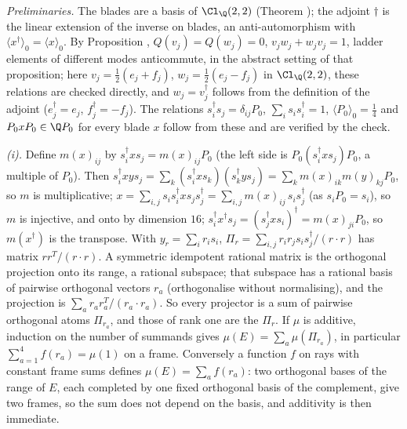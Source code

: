 \emph{Preliminaries.} The blades are a basis of $\Cl_{\Q}(2,2)$ (Theorem ); the adjoint $\dagger$ is the linear extension of the inverse on blades, an anti-automorphism with $\langle x^{\dagger}\rangle_{0} = \langle x\rangle_{0}$. By Proposition , $Q(v_{j}) = Q(w_{j}) = 0$, $v_{j}w_{j} + w_{j}v_{j} = 1$, ladder elements of different modes anticommute, in the abstract setting of that proposition; here $v_{j} = \tfrac12(e_{j} + f_{j})$, $w_{j} = \tfrac12(e_{j} - f_{j})$ in $\Cl_{\Q}(2,2)$, these relations are checked directly, and $w_{j} = v_{j}^{\dagger}$ follows from the definition of the adjoint ($e_{j}^{\dagger} = e_{j}$, $f_{j}^{\dagger} = -f_{j}$). The relations $s_{i}^{\dagger}s_{j} = \delta_{ij}P_{0}$, $\sum_{i}s_{i}s_{i}^{\dagger} = 1$, $\langle P_{0}\rangle_{0} = \tfrac14$ and $P_{0}xP_{0} \in \Q P_{0}$ for every blade $x$ follow from these and are verified by the check.

\emph{(i).} Define $m(x)_{ij}$ by $s_{i}^{\dagger}xs_{j} = m(x)_{ij}P_{0}$ (the left side is $P_{0}(s_{i}^{\dagger}xs_{j})P_{0}$, a multiple of $P_{0}$). Then $s_{i}^{\dagger}xys_{j} = \sum_{k}(s_{i}^{\dagger}xs_{k})(s_{k}^{\dagger}ys_{j}) = \sum_{k}m(x)_{ik}m(y)_{kj}P_{0}$, so $m$ is multiplicative; $x = \sum_{i,j}s_{i}s_{i}^{\dagger}xs_{j}s_{j}^{\dagger} = \sum_{i,j}m(x)_{ij}\,s_{i}s_{j}^{\dagger}$ (as $s_{i}P_{0} = s_{i}$), so $m$ is injective, and onto by dimension $16$; $s_{i}^{\dagger}x^{\dagger}s_{j} = (s_{j}^{\dagger}xs_{i})^{\dagger} = m(x)_{ji}P_{0}$, so $m(x^{\dagger})$ is the transpose. With $y_{r} = \sum_{i}r_{i}s_{i}$, $\Pi_{r} = \sum_{i,j}r_{i}r_{j}s_{i}s_{j}^{\dagger}/(r \cdot r)$ has matrix $rr^{T}/(r \cdot r)$. A symmetric idempotent rational matrix is the orthogonal projection onto its range, a rational subspace; that subspace has a rational basis of pairwise orthogonal vectors $r_{a}$ (orthogonalise without normalising), and the projection is $\sum_{a}r_{a}r_{a}^{T}/(r_{a} \cdot r_{a})$. So every projector is a sum of pairwise orthogonal atoms $\Pi_{r_{a}}$, and those of rank one are the $\Pi_{r}$. If $\mu$ is additive, induction on the number of summands gives $\mu(E) = \sum_{a}\mu(\Pi_{r_{a}})$, in particular $\sum_{a=1}^{4}f(r_{a}) = \mu(1)$ on a frame. Conversely a function $f$ on rays with constant frame sums defines $\mu(E) = \sum_{a}f(r_{a})$: two orthogonal bases of the range of $E$, each completed by one fixed orthogonal basis of the complement, give two frames, so the sum does not depend on the basis, and additivity is then immediate.

